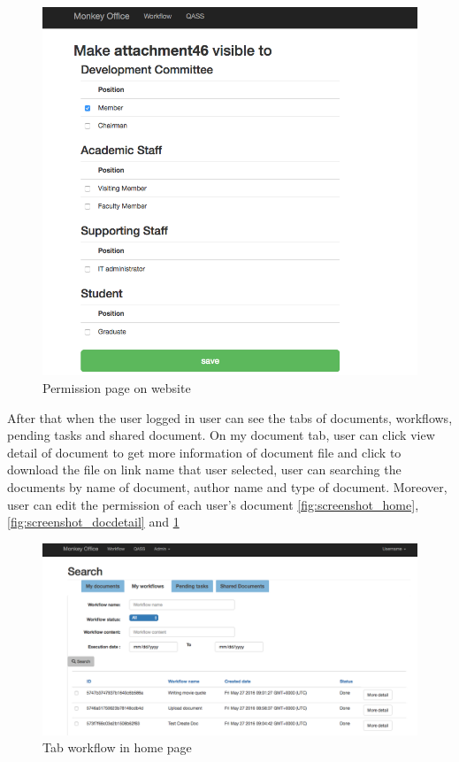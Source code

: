 \begin{figure}[h!]

	\centering
	\includegraphics[scale=0.3]{res/permission_page}
	\caption{Permission page on website}
	\label{fig:screenshot_permission}
\end{figure}


After that when the user logged in 	user can see the tabs of documents, workflows, pending tasks and shared document. On my document tab, user can click view detail of document to get more information of document file and click to download the file on link name that user selected, user can searching the documents by name of document, author name and type of document. Moreover, user can edit the permission of each user's document \ref{fig:screenshot_home}, \ref{fig:screenshot_docdetail} and \ref{fig:screenshot_permission}

\begin{figure}[h!]

	\centering
	\caption{Tab workflow in home page}
	\label{fig:screenshot_tabwf}
	\includegraphics[scale=0.3]{res/tab_wf_page}
\end{figure}


